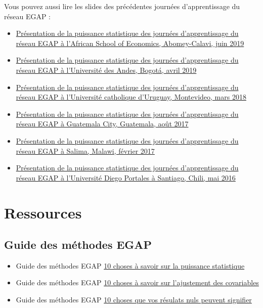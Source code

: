 \documentclass[12pt,]{book}
\begin{document}
Vous pouvez aussi lire les slides des précédentes journées d'apprentissage du réseau EGAP :

\begin{itemize}
\item
  \href{https://egap.github.io/learningdays-resources/Slides/Examples/power-benin.pdf}{Présentation de la puissance statistique des journées d'apprentissage du réseau EGAP à l'African School of Economics, Abomey-Calavi, juin 2019}
\item
  \href{https://egap.github.io/learningdays-resources/Slides/Examples/power-bogota.pdf}{Présentation de la puissance statistique des journées d'apprentissage du réseau EGAP à l'Université des Andes, Bogotá, avril 2019}
\item
  \href{https://egap.github.io/learningdays-resources/Slides/Examples/power-montevideo.pdf}{Présentation de la puissance statistique des journées d'apprentissage du réseau EGAP à l'Université catholique d'Uruguay, Montevideo, mars 2018}
\item
  \href{https://egap.github.io/learningdays-resources/Slides/Examples/power-guatemala.html}{Présentation de la puissance statistique des journées d'apprentissage du réseau EGAP à Guatemala City, Guatemala, août 2017}
\item
  \href{https://egap.github.io/learningdays-resources/Slides/Examples/power-malawi.pdf}{Présentation de la puissance statistique des journées d'apprentissage du réseau EGAP à Salima, Malawi, février 2017}
\item
  \href{https://egap.github.io/learningdays-resources/Slides/Examples/power-santiago.pdf}{Présentation de la puissance statistique des journées d'apprentissage du réseau EGAP à l'Université Diego Portales à Santiago, Chili, mai 2016}
\end{itemize}

\hypertarget{ressources-5}{%
\section{Ressources}\label{ressources-5}}

\hypertarget{guide-des-muxe9thodes-egap-5}{%
\subsection{Guide des méthodes EGAP}\label{guide-des-muxe9thodes-egap-5}}

\begin{itemize}
\item
  Guide des méthodes EGAP \href{https://egap.org/resource/10-things-you-need-know-about-statistical-power/}{10 choses à savoir sur la puissance statistique}
\item
  Guide des méthodes EGAP \href{https://egap.org/resource/10-things-to-know-about-covariate-adjustment/}{10 choses à savoir sur l'ajustement des covariables}
\item
  Guide des méthodes EGAP \href{https://egap.org/resource/10-things-your-null-result-might-mean/}{10 choses que vos résulats nuls peuvent signifier}
\end{itemize}
\end{document}
